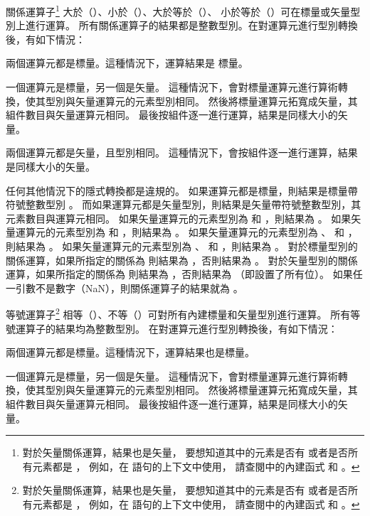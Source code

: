 {%
\startitem
關係運算子\footnote{
對於矢量關係運算，結果也是矢量，
要想知道其中的元素是否有  或者是否所有元素都是 ，
例如，在  語句的上下文中使用，
請查閱中的內建函式  和 。}
大於（\ccmm{>}）、小於（\ccmm{<}）、大於等於（\ccmm{>=}）、
小於等於（\ccmm{<=}）可在標量或矢量型別上進行運算。
所有關係運算子的結果都是整數型別。在對運算元進行型別轉換後，有如下情況：
\startigBig
\item 兩個運算元都是標量。這種情況下，運算結果是  標量。

\item 一個運算元是標量，另一個是矢量。
這種情況下，會對標量運算元進行算術轉換，使其型別與矢量運算元的元素型別相同。
然後將標量運算元拓寬成矢量，其組件數目與矢量運算元相同。
最後按組件逐一進行運算，結果是同樣大小的矢量。

\item 兩個運算元都是矢量，且型別相同。
這種情況下，會按組件逐一進行運算，結果是同樣大小的矢量。
\stopigBig

任何其他情況下的隱式轉換都是違規的。
如果運算元都是標量，則結果是標量帶符號整數型別 。
而如果運算元都是矢量型別，則結果是矢量帶符號整數型別，其元素數目與運算元相同。
如果矢量運算元的元素型別為  和 ，則結果為 。
如果矢量運算元的元素型別為  和 ，則結果為 。
如果矢量運算元的元素型別為 、  和 ，則結果為 。
如果矢量運算元的元素型別為 、  和 ，則結果為 。
對於標量型別的關係運算，如果所指定的關係為  則結果為 ，否則結果為 。
對於矢量型別的關係運算，如果所指定的關係為  則結果為 ，否則結果為  （即設置了所有位）。
如果任一引數不是數字（NaN），則關係運算子的結果就為 。
\stopitem

\startitem
等號運算子\footnote{
對於矢量關係運算，結果也是矢量，
要想知道其中的元素是否有  或者是否所有元素都是 ，
例如，在  語句的上下文中使用，
請查閱中的內建函式  和 。}
相等（\ccmm{==}）、不等（\ccmm{!=}）可對所有內建標量和矢量型別進行運算。
所有等號運算子的結果均為整數型別。
在對運算元進行型別轉換後，有如下情況：
\startigBig
\item 兩個運算元都是標量。這種情況下，運算結果也是標量。

\item 一個運算元是標量，另一個是矢量。
這種情況下，會對標量運算元進行算術轉換，使其型別與矢量運算元的元素型別相同。
然後將標量運算元拓寬成矢量，其組件數目與矢量運算元相同。
最後按組件逐一進行運算，結果是同樣大小的矢量。

}
